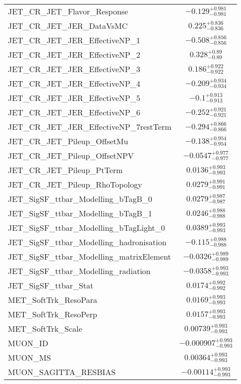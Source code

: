 \begin{tabular}{|l|c|}
JET\_CR\_JET\_Flavor\_Response & $-0.129^{+0.981}_{-0.981}$ \\
JET\_CR\_JET\_JER\_DataVsMC & $0.225^{+0.836}_{-0.836}$ \\
JET\_CR\_JET\_JER\_EffectiveNP\_1 & $-0.508^{+0.856}_{-0.856}$ \\
JET\_CR\_JET\_JER\_EffectiveNP\_2 & $0.328^{+0.89}_{-0.89}$ \\
JET\_CR\_JET\_JER\_EffectiveNP\_3 & $0.186^{+0.922}_{-0.922}$ \\
JET\_CR\_JET\_JER\_EffectiveNP\_4 & $-0.209^{+0.934}_{-0.934}$ \\
JET\_CR\_JET\_JER\_EffectiveNP\_5 & $-0.1^{+0.913}_{-0.913}$ \\
JET\_CR\_JET\_JER\_EffectiveNP\_6 & $-0.252^{+0.921}_{-0.921}$ \\
JET\_CR\_JET\_JER\_EffectiveNP\_7restTerm & $-0.294^{+0.866}_{-0.866}$ \\
JET\_CR\_JET\_Pileup\_OffsetMu & $-0.138^{+0.954}_{-0.954}$ \\
JET\_CR\_JET\_Pileup\_OffsetNPV & $-0.0547^{+0.977}_{-0.977}$ \\
JET\_CR\_JET\_Pileup\_PtTerm & $0.0136^{+0.993}_{-0.993}$ \\
JET\_CR\_JET\_Pileup\_RhoTopology & $0.0279^{+0.991}_{-0.991}$ \\
JET\_SigSF\_ttbar\_Modelling\_bTagB\_0 & $0.0279^{+0.987}_{-0.987}$ \\
JET\_SigSF\_ttbar\_Modelling\_bTagB\_1 & $0.0246^{+0.988}_{-0.988}$ \\
JET\_SigSF\_ttbar\_Modelling\_bTagLight\_0 & $0.0389^{+0.993}_{-0.993}$ \\
JET\_SigSF\_ttbar\_Modelling\_hadronisation & $-0.115^{+0.988}_{-0.988}$ \\
JET\_SigSF\_ttbar\_Modelling\_matrixElement & $-0.0326^{+0.989}_{-0.989}$ \\
JET\_SigSF\_ttbar\_Modelling\_radiation & $-0.0358^{+0.993}_{-0.993}$ \\
JET\_SigSF\_ttbar\_Stat & $0.0174^{+0.992}_{-0.992}$ \\
MET\_SoftTrk\_ResoPara & $0.0169^{+0.993}_{-0.993}$ \\
MET\_SoftTrk\_ResoPerp & $0.0157^{+0.993}_{-0.993}$ \\
MET\_SoftTrk\_Scale & $0.00739^{+0.993}_{-0.993}$ \\
MUON\_ID & $-0.000907^{+0.993}_{-0.993}$ \\
MUON\_MS & $0.00364^{+0.993}_{-0.993}$ \\
MUON\_SAGITTA\_RESBIAS & $-0.00114^{+0.993}_{-0.993}$ \\

\end{tabular}
